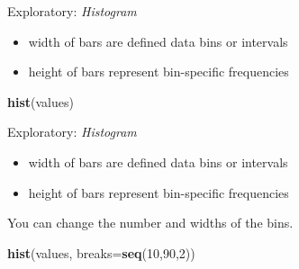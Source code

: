 \documentclass[ignorenonframetext,t]{beamer}
\newenvironment{Shaded}{\begin{snugshade}}{\end{snugshade}}
\newcommand{\KeywordTok}[1]{\textcolor[rgb]{0.13,0.29,0.53}{\textbf{#1}}}
\newcommand{\DataTypeTok}[1]{\textcolor[rgb]{0.13,0.29,0.53}{#1}}
\newcommand{\DecValTok}[1]{\textcolor[rgb]{0.00,0.00,0.81}{#1}}
\newcommand{\NormalTok}[1]{#1}
\providecommand{\tightlist}{%
  \setlength{\itemsep}{0pt}\setlength{\parskip}{0pt}}
\begin{document}
\begin{frame}[fragile]{Exploratory: \emph{Histogram}}

\begin{itemize}
\tightlist
\item
  width of bars are defined data bins or intervals
\item
  height of bars represent bin-specific frequencies
\end{itemize}

\begin{Shaded}
\begin{Highlighting}[]
\KeywordTok{hist}\NormalTok{(values)}
\end{Highlighting}
\end{Shaded}


\end{frame}

\begin{frame}[fragile]{Exploratory: \emph{Histogram}}

\begin{itemize}
\tightlist
\item
  width of bars are defined data bins or intervals
\item
  height of bars represent bin-specific frequencies
\end{itemize}

You can change the number and widths of the bins.

\begin{Shaded}
\begin{Highlighting}[]
\KeywordTok{hist}\NormalTok{(values, }\DataTypeTok{breaks=}\KeywordTok{seq}\NormalTok{(}\DecValTok{10}\NormalTok{,}\DecValTok{90}\NormalTok{,}\DecValTok{2}\NormalTok{))}
\end{Highlighting}
\end{Shaded}


\end{frame}
\end{document}
